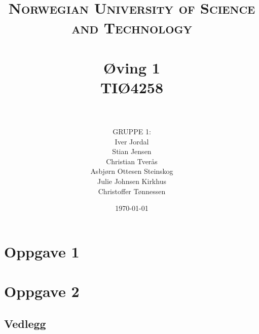 \documentclass[paper=a4, fontsize=11pt]{scrartcl} %
\title{ 
\normalfont \normalsize 
\textsc{Norwegian University of Science and Technology} \\ [25pt] %
\horrule{0.5pt} \\[0.4cm] %
\huge \textbf{Øving 1} \\ %
TIØ4258 \\
\horrule{2pt} \\[0.5cm] %
}
\author{GRUPPE 1:\\Iver Jordal\\Stian Jensen\\Christian Tverås\\Asbjørn Ottesen Steinskog\\Julie Johnsen Kirkhus\\Christoffer Tønnessen}
\date{\normalsize \today}
\numberwithin{equation}{section} %
\numberwithin{figure}{section} %
\numberwithin{table}{section} %
\begin{document}

\maketitle

\thispagestyle{firststyle}

\newpage

\renewcommand*\contentsname{Innhold}
\tableofcontents

\setcounter{secnumdepth}{3}

\newpage


\section{Oppgave 1}

\newpage

\section{Oppgave 2}




\newpage


\newpage


\newpage


\begin{alphasection}
\section{Vedlegg}

\end{alphasection}
\end{document}
